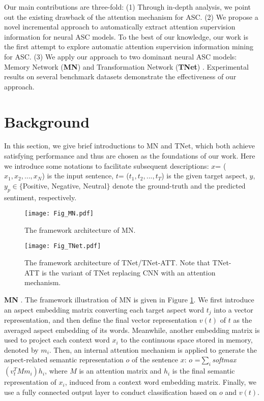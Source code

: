 \documentclass[11pt,a4paper]{article}
\begin{document}
Our main contributions are three-fold:
(1) Through in-depth analysis,
we point out the existing drawback of the attention mechanism for ASC.
(2)
We propose a novel incremental approach to automatically extract attention supervision information for neural ASC models.
To the best of our knowledge,
our work is the first attempt to explore automatic attention supervision information mining for ASC.
(3) We apply our approach to two dominant neural ASC models:
Memory Network (\textbf{MN}) \cite{Tang:EMNLP2016,Wang:ACL2018} and Transformation Network (\textbf{TNet}) \cite{Li:ACL2018}.
Experimental results on several benchmark datasets
demonstrate the effectiveness of our approach.





\section{Background}\label{Section_Background}
In this section,
we give brief introductions to MN and TNet,
which both achieve satisfying performance and thus are chosen as the foundations of our work.
Here we
introduce some notations to facilitate subsequent descriptions:
$x$= ($x_1,x_2,...,x_N$) is the input sentence,
$t$= ($t_1,t_2,...,t_T$) is the given target aspect,
$y$, $y_p$$\in$$\{$Positive, Negative, Neutral$\}$
denote the ground-truth and the predicted sentiment, respectively.

\begin{figure}[!t]
	\centering
	\texttt{[image: Fig\_MN.pdf]}
	\caption{\label{Fig_MN}
		The framework architecture of MN.
	}
\end{figure}

\begin{figure}[!t]
	\centering
	\texttt{[image: Fig\_TNet.pdf]}
	\caption{\label{Fig_TNet}
		The framework architecture of \textcolor[rgb]{1,0,0}{TNet}/\textcolor[rgb]{0,0,1}{TNet-ATT}.
Note that TNet-ATT is the variant of TNet replacing CNN with an attention mechanism.
	}
\end{figure}

\textbf{MN} \cite{Tang:EMNLP2016,Wang:ACL2018}.
The framework illustration of MN is given in Figure \ref{Fig_MN}.
We first introduce an aspect embedding matrix converting each target aspect word $t_j$ into a vector representation,
and then define the final vector representation $v(t)$ of $t$ as the averaged aspect embedding of its words.
Meanwhile,
another embedding matrix is used to project each context word $x_i$ to the continuous space stored in memory,
denoted by $m_i$.
Then,
an internal attention mechanism is applied to generate the aspect-related semantic representation $o$ of the sentence $x$:
$o$ =$\sum_i$\emph{softmax}$(v_t^T M m_i) h_i$,
where $M$ is an attention matrix and $h_i$ is the final semantic representation of $x_i$,
induced from a context word embedding matrix.
Finally,
we use a fully connected output layer to conduct classification based on $o$ and $v(t)$.
\end{document}

